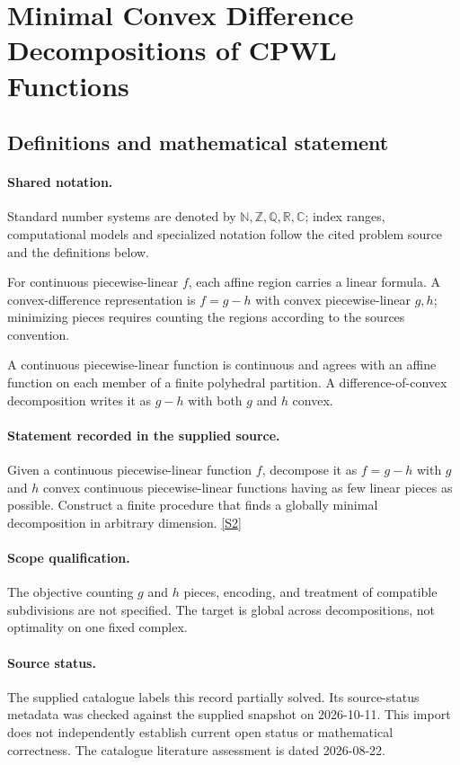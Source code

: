 \documentclass[11pt]{article}
\newcommand{\sref}[2]{\hyperlink{source:#1:#2}{[S#2]}}
\begin{document}
\section{Minimal Convex Difference Decompositions of CPWL Functions}\label{statement}

\subsection{Definitions and mathematical statement}

\paragraph{Shared notation.}Standard number systems are denoted by $\mathbb N,\mathbb Z,\mathbb Q,\mathbb R,\mathbb C$; index ranges, computational models and specialized notation follow the cited problem source and the definitions below.


For continuous piecewise-linear $f$, each affine region carries a linear formula. A convex-difference representation is $f=g-h$ with convex piecewise-linear $g,h$; minimizing pieces requires counting the regions according to the source\textquotesingle s convention.

A continuous piecewise-linear function is continuous and agrees with an affine function on each member of a finite polyhedral partition. A difference-of-convex decomposition writes it as $g-h$ with both $g$ and $h$ convex.
\paragraph{Statement recorded in the supplied source.}
Given a continuous piecewise-linear function $f$, decompose it as $f=g-h$ with $g$ and $h$ convex continuous piecewise-linear functions having as few linear pieces as possible. Construct a finite procedure that finds a globally minimal decomposition in arbitrary dimension. \sref{statement}{2}
\paragraph{Scope qualification.}
The objective counting $g$ and $h$ pieces, encoding, and treatment of compatible subdivisions are not specified. The target is global across decompositions, not optimality on one fixed complex.
\paragraph{Source status.}
The supplied catalogue labels this record partially solved. Its source-status metadata was checked against the supplied snapshot on 2026-10-11. This import does not independently establish current open status or mathematical correctness. The catalogue literature assessment is dated 2026-08-22.
\end{document}
